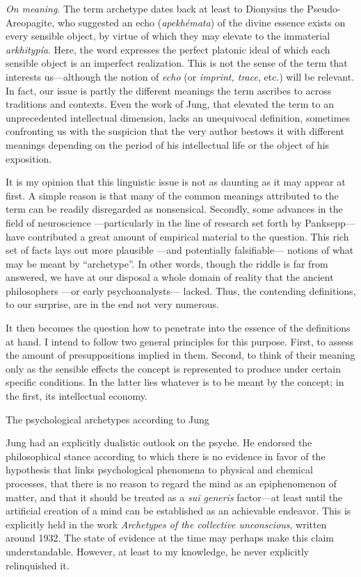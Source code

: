 \documentclass[a4paper]{article}
\begin{document}
    \textit{On meaning}. The term archetype dates back at least to Dionysius the
    Pseudo-Areopagite, who suggested an echo (\textit{apekhémata}) of the divine
    essence exists on every sensible object, by virtue of which they may elevate
    to the immaterial \textit{arkhitypía}. Here, the word expresses the perfect
    platonic ideal of which each sensible object is an imperfect realization.
    This is not the sense of the term that interests us---although the notion of
    \textit{echo} (or \textit{imprint, trace}, etc.) will be relevant. In fact,
    our issue is partly the different meanings the term ascribes to across
    traditions and contexts. Even the work of Jung, that elevated the term to an
    unprecedented intellectual dimension, lacks an unequivocal definition,
    sometimes confronting us with the suspicion that the very author
    bestows it with different meanings depending on the period of his
    intellectual life or the object of his exposition. 

    It is my opinion that this linguistic issue is not as daunting as it may
    appear at first. A simple reason is that many of the common meanings
    attributed to the term can be readily disregarded as nonsensical. Secondly,
    some advances in the field of neuroscience —particularly in the line of
    research set forth by Panksepp— have contributed a great amount of empirical
    material to the question. This rich set of facts lays out more plausible
    —and potentially falsifiable— notions of what may be meant by “archetype”.
    In other words, though the riddle is far from answered, we have at our
    disposal a whole domain of reality that the ancient philosophers —or early
    psychoanalysts— lacked. Thus, the contending definitions, to our surprise,
    are in the end not very numerous. 

    It then becomes the question how to penetrate into the
    essence of the definitions at hand. I intend to follow two general
    principles for this purpose. First, to assess the amount of presuppositions
    implied in them. Second, to think of their meaning only as the sensible
    effects the concept is represented to produce under certain specific
    conditions. In the latter lies whatever is to be meant by the concept; in
    the first, its intellectual economy. 

    The psychological archetypes according
    to Jung 

    Jung had an explicitly dualistic outlook on the psyche. He endorsed
    the philosophical stance according to which there is no evidence in favor of
    the hypothesis that links psychological phenomena to physical and chemical
    processes, that there is no reason to regard the mind as an epiphenomenon of
    matter, and that it should be treated as a \textit{sui generis} factor—at least
    until the artificial creation of a mind can be established as an achievable
    endeavor. This is explicitly held in the work \textit{Archetypes of the collective
    unconscious}, written around 1932. The state of evidence at the time may
    perhaps make this claim understandable. However, at least to my
    knowledge, he never explicitly relinquished it. 
\end{document}

